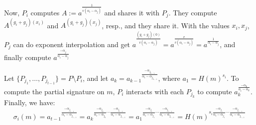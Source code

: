 Now, $P_i$ computes $A := a^{\frac{1}{v(\alpha_i - \alpha_j)}}$ and shares it with $P_j$. They compute $A^{(g_i + g_j)(x_i)}$ and $A^{(g_i + g_j)(x_j)}$, resp., and they share it. With the values $x_i, x_j$, $P_j$ can do exponent interpolation and get $ a^{\frac{(g_i + g_j)(0)}{v(\alpha_i - \alpha_j)}} = a^{\frac{v}{v(\alpha_i - \alpha_j)}} = a^{\frac{1}{\alpha_i - \alpha_j}}$, and finally compute $a^{\frac{-\alpha_j}{\alpha_i - \alpha_j}}$

Let $\{ P_{j_1}, \dots , P_{j_{t-1}} \} = P \setminus P_i$, and let $a_k =  a_{k-1} {}^{\frac{- \alpha_{j_{k-1}}}{\alpha_{i} - \alpha_{j_{k-1}}}}$, where $a_1 = H(m)^{s_i}$. To compute the partial signature on $m$, $P_i$ interacts with each $P_{j_k}$ to compute $a_k^{\frac{-\alpha_k}{\alpha_i - \alpha_k}}$. Finally, we have:
$$
\sigma_i (m)
= a_{t-1} {}^{\frac{- \alpha_{j_{t-1}}}{\alpha_{i} - \alpha_{j_{t-1}}}}
= a_k {}^{\frac{- \alpha_{j_{k}}}{\alpha_{i} - \alpha_{j_{k}}} \cdots \frac{- \alpha_{j_{t-1}}}{\alpha_{i} - \alpha_{j_{t-1}}}}
= a_1 {}^{\frac{- \alpha_{j_{1}}}{\alpha_{i} - \alpha_{j_{1}}} \cdots \frac{- \alpha_{j_{t-1}}}{\alpha_{i} - \alpha_{j_{t-1}}}}
= H(m)^{ s_i \frac{- \alpha_{j_{1}}}{\alpha_{i} - \alpha_{j_{1}}} \cdots \frac{- \alpha_{j_{t-1}}}{\alpha_{i} - \alpha_{j_{t-1}}}}
$$

